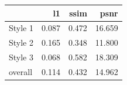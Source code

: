 \begin{tabular}{lrrr}
\toprule
 & l1 & ssim & psnr \\
\midrule
Style 1 & 0.087 & 0.472 & 16.659 \\
Style 2 & 0.165 & 0.348 & 11.800 \\
Style 3 & 0.068 & 0.582 & 18.309 \\
overall & 0.114 & 0.432 & 14.962 \\
\bottomrule
\end{tabular}

